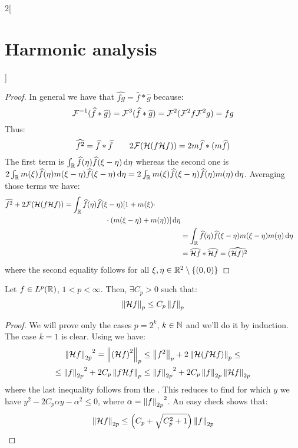 \documentclass[../../../main_math.tex]{subfiles}
\begin{document}
\begin{multicols}{2}[\section{Harmonic analysis}]
\begin{proof}
    In general we have that $\widehat{fg}=\widehat{f}*\widehat{g}$ because:
    $$
      \mathcal{F}^{-1}(\widehat{f}*\widehat{g})=\mathcal{F}^3(\widehat{f}*\widehat{g})=\mathcal{F}^2(\mathcal{F}^2 f \mathcal{F}^2 g)=fg
    $$
    Thus:
    $$
      \widehat{f^2}= \widehat{f}*\widehat{f}\qquad
      2\mathcal{F}{(\mathcal{H}(f\mathcal{H} f))}=2m \widehat{f}*(m \widehat{f})
    $$
    The first term is $\int_{\mathbb{R}} \widehat{f}(\eta)\widehat{f}(\xi-\eta)\dd{\eta}$ whereas the second one is $2\int_{\mathbb{R}} m(\xi)\widehat{f}(\eta)m(\xi-\eta)\widehat{f}(\xi-\eta)\dd{\eta}=2\int_{\mathbb{R}} m(\xi)\widehat{f}(\xi-\eta)\widehat{f}(\eta)m(\eta)\dd{\eta}$.
    Averaging those terms we have:
    \begin{align*}
      \begin{split}
        \widehat{f^2}+2\mathcal{F}{(\mathcal{H}(f\mathcal{H} f))} & =\int_{\mathbb{R}} \widehat{f}(\eta)\widehat{f}(\xi-\eta)[1+m(\xi)\cdot \\
          & \hspace{2cm}\cdot(m(\xi-\eta)+m(\eta))]\dd{\eta}
      \end{split} \\
       & =\int_{\mathbb{R}} \widehat{f}(\eta)\widehat{f}(\xi-\eta)m(\xi-\eta)m(\eta)\dd{\eta}                  \\
       & =\widehat{\mathcal{H} f}*\widehat{\mathcal{H} f}=\widehat{(\mathcal{H} f)^2}
    \end{align*}
    where the second equality follows for all $\xi,\eta\in\mathbb{R}^2\setminus\{(0,0)\}$
  \end{proof}
  \begin{theorem}
    Let $f\in L^p(\mathbb{R})$, $1<p<\infty$. Then, $\exists C_p>0$ such that:
    $$
      \left\|\mathcal{H} f\right\|_p \leq C_p \left\|f\right\|_p
    $$
  \end{theorem}
  \begin{proof}
    We will prove only the cases $p=2^k$, $k\in\mathbb{N}$ and we'll do it by induction. The case $k=1$ is clear. Using  we have:
    \begin{multline*}
      {\left\|\mathcal{H}f\right\|_{2p}}^2=\left\|{(\mathcal{H} f)}^2\right\|_p\leq \left\|f^2\right\|_p+2\left\|\mathcal{H}(f\mathcal{H} f)\right\|_p\leq\\\leq {\left\|f\right\|_{2p}}^2+2C_p\left\|f\mathcal{H} f\right\|_{p}\leq {\left\|f\right\|_{2p}}^2+2C_p\left\|f\right\|_{2p}\left\|\mathcal{H} f\right\|_{2p}
    \end{multline*}
    where the last inequality follows from the . This reduces to find for which $y$ we have $y^2 - 2C_p \alpha y - \alpha^2\leq 0$, where $\alpha={\left\|f\right\|_{2p}}^2$. An easy check shows that:
    $$
      \left\|\mathcal{H} f\right\|_{2p}\leq \left(C_p + \sqrt{C_p^2+1}\right)\left\|f\right\|_{2p}
    $$
  \end{proof}

\end{multicols}
\end{document}
